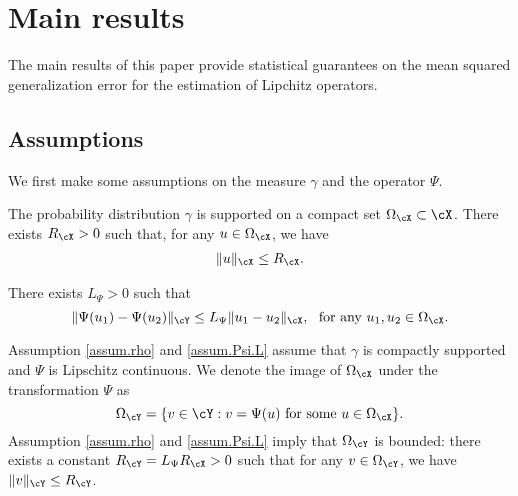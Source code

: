 \documentclass[11pt]{article} %
\newcommand{\commentout}[1]{}
\begin{document}
\section{Main results}\label{sec.mainresults}
The main results of this paper provide statistical guarantees on the mean squared generalization error for the estimation of Lipchitz operators.



\subsection{Assumptions}
We first make some assumptions on the measure $\gamma$ and the operator $\Psi$.
\begin{assumption}
\label{assum.rho}
The probability distribution $\gamma$ is supported on a compact set $\Omega_{\cX}\subset \cX$. There exists $R_{\cX}>0$ such that, for any $u\in \Omega_{\cX}$, we have
	\begin{align}
		\|u\|_{\cX}\leq R_{\cX}.
	\end{align}
	\end{assumption}
	
	
\begin{assumption}
\label{assum.Psi.L}
There exists $L_{\Psi}>0$ such that
		$$
		\|\Psi(u_1)-\Psi(u_2)\|_{\cY}\leq L_{\Psi}\|u_1-u_2\|_{\cX}, \ \text{ for any } u_1,u_2\in \Omega_{\cX}.
		$$	
\end{assumption}
Assumption \ref{assum.rho} and \ref{assum.Psi.L} assume that $\gamma$ is compactly supported and $\Psi$ is Lipschitz continuous. We denote the image of $\Omega_{\cX}$ under the transformation $\Psi$ as
$$
	\Omega_{\cY}=\{v\in \cY: v=\Psi(u) \mbox{ for some } u\in\Omega_{\cX}\}.
$$
Assumption \ref{assum.rho} and \ref{assum.Psi.L} imply that $\Omega_{\cY}$ is bounded: there exists a constant $R_{\cY}=L_{\Psi}R_{\cX}>0$ such that for any $v\in \Omega_{\cY}$, we have $\|v\|_{\cY}\leq R_{\cY}$.
\end{document}
